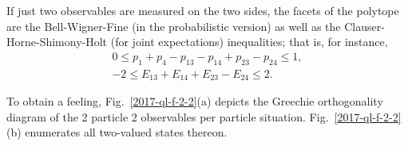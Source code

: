 \documentclass[%
  twocolumn,
 showpacs,
 showkeys,
 preprintnumbers,
 amsmath,amssymb,
 aps,
  pra,
  longbibliography,
 floatfix,
 ]{revtex4-1}
\begin{document}
If  just two observables are measured on the two sides,
the facets of the polytope
are
the Bell-Wigner-Fine (in the probabilistic version)
as well as the Clauser-Horne-Shimony-Holt (for joint expectations)  inequalities;
that is, for instance,
\begin{equation}
\begin{split}
0\le   p_{1} +p_{4}  -p_{13}  -p_{14}  +p_{23}  -p_{24}       \le   1,\\
-2 \le   E_{13} + E_{14} + E_{23} - E_{24}        \le       2   .
\end{split}
\label{2017-b-2-2-e-p}
\end{equation}

To obtain a feeling, Fig.~\ref{2017-ql-f-2-2}(a)  depicts the Greechie orthogonality diagram of the 2 particle 2 observables per particle situation.
Fig.~\ref{2017-ql-f-2-2}(b) enumerates all two-valued states thereon.
\end{document}
